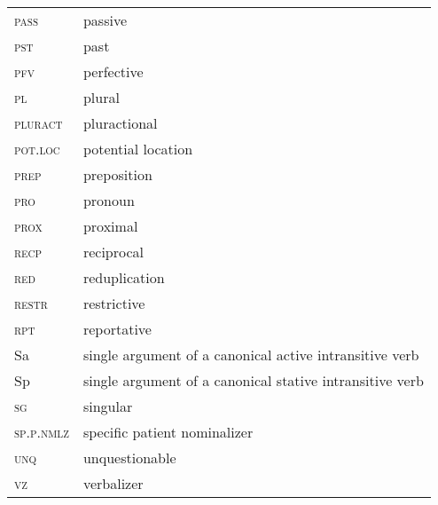 \documentclass[output=paper]{langscibook}
\begin{document}
\begin{tabularx}{.45\textwidth}[t]{lQ}
\textsc{pass} &  passive\\  
\textsc{pst} & past\\
\textsc{pfv} & perfective\\  
\textsc{pl} & plural\\
\textsc{pluract} & pluractional\\ 
\textsc{pot.loc} & potential location\\
\textsc{prep} & preposition\\  
\textsc{pro} &  pronoun \\ 
\textsc{prox} & proximal \\
\textsc{recp} & reciprocal \\ 
\textsc{red} & reduplication \\ 
\textsc{restr} & restrictive \\ 
\textsc{rpt} & reportative \\   
Sa & single argument of a canonical active intransitive verb \\    
Sp & single argument of a canonical stative intransitive verb \\
\textsc{sg} & singular\\
\textsc{sp.p.nmlz} & specific patient nominalizer\\
\textsc{unq} & unquestionable \\ 
\textsc{vz}  & verbalizer \\
\end{tabularx}
         

\sloppy\printbibliography[heading=subbibliography,notkeyword=this]
\end{document}
